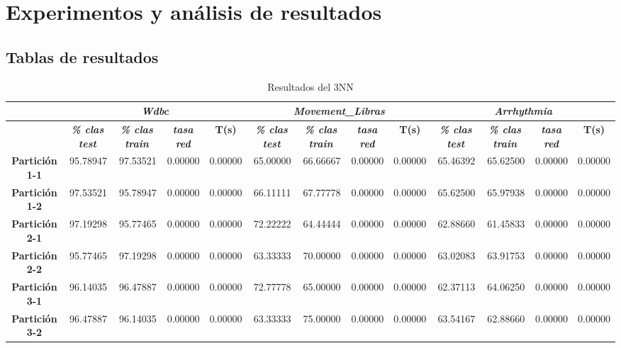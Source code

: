 \documentclass[a4paper,11pt]{article}
\begin{document}
 \section{Experimentos y análisis de resultados}
 \subsection{Tablas de resultados}
  \begin{table}[H]	
  \caption{Resultados del 3NN}
  \begin{adjustbox}{width=1.1\textwidth}
  \begin{tabular}{|c|r|r|r|r|r|r|r|r|r|r|r|r|}
  \hline
  \multicolumn{1}{|l|}{} & \multicolumn{ 4}{c|}{\textbf{\textit{Wdbc}}} & \multicolumn{ 4}{c|}{\textbf{\textit{Movement\_Libras}}} & \multicolumn{ 4}{c|}{\textbf{\textit{Arrhythmia}}} \\ \hline
  & \multicolumn{1}{c|}{\textbf{\textit{\% clas test}}} & \multicolumn{1}{c|}{\textbf{\textit{\% clas train}}} & \multicolumn{1}{c|}{\textbf{\textit{tasa red}}} & \multicolumn{1}{c|}{\textbf{T(s)}} & \multicolumn{1}{c|}{\textbf{\textit{\% clas test}}} & \multicolumn{1}{c|}{\textbf{\textit{\% clas train}}} & \multicolumn{1}{c|}{\textbf{\textit{tasa red}}} & \multicolumn{1}{c|}{\textbf{T(s)}} & \multicolumn{1}{c|}{\textbf{\textit{\% clas test}}} & \multicolumn{1}{c|}{\textbf{\textit{\% clas train}}} & \multicolumn{1}{c|}{\textbf{\textit{tasa red}}} & \multicolumn{1}{c|}{\textbf{T(s)}} \\ \hline
  \textbf{Partición 1-1} & 95.78947 & 97.53521 & 0.00000 & 0.00000 & 65.00000 & 66.66667 & 0.00000 & 0.00000 & 65.46392 & 65.62500 & 0.00000 & 0.00000 \\ \hline
  \textbf{Partición 1-2} & 97.53521 & 95.78947 & 0.00000 & 0.00000 & 66.11111 & 67.77778 & 0.00000 & 0.00000 & 65.62500 & 65.97938 & 0.00000 & 0.00000 \\ \hline
  \textbf{Partición 2-1} & 97.19298 & 95.77465 & 0.00000 & 0.00000 & 72.22222 & 64.44444 & 0.00000 & 0.00000 & 62.88660 & 61.45833 & 0.00000 & 0.00000 \\ \hline
  \textbf{Partición 2-2} & 95.77465 & 97.19298 & 0.00000 & 0.00000 & 63.33333 & 70.00000 & 0.00000 & 0.00000 & 63.02083 & 63.91753 & 0.00000 & 0.00000 \\ \hline
  \textbf{Partición 3-1} & 96.14035 & 96.47887 & 0.00000 & 0.00000 & 72.77778 & 65.00000 & 0.00000 & 0.00000 & 62.37113 & 64.06250 & 0.00000 & 0.00000 \\ \hline
  \textbf{Partición 3-2} & 96.47887 & 96.14035 & 0.00000 & 0.00000 & 63.33333 & 75.00000 & 0.00000 & 0.00000 & 63.54167 & 62.88660 & 0.00000 & 0.00000 \\ \hline

\end{tabular}
\end{adjustbox}
\end{table}
\end{document}

